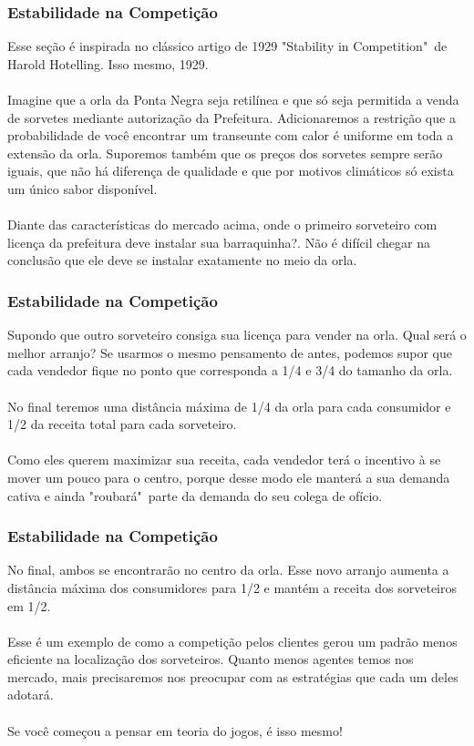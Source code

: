 \documentclass{beamer}[10]
\begin{document}

\begin{frame}
	\frametitle{Estabilidade na Competição}

	Esse seção é inspirada no clássico artigo de 1929 "Stability in Competition"\ de Harold Hotelling. Isso mesmo, 1929.
	\\~\\
	Imagine que a orla da Ponta Negra seja retilínea e que só seja permitida a venda de sorvetes mediante autorização da Prefeitura. Adicionaremos a restrição que a probabilidade de você encontrar um transeunte com calor é uniforme em toda a extensão da orla. Suporemos também que os preços dos sorvetes sempre serão iguais, que não há diferença de qualidade e que por motivos climáticos só exista um único sabor disponível.
	\\~\\
	Diante das características do mercado acima, onde o primeiro sorveteiro com licença da prefeitura deve instalar sua barraquinha?. Não é difícil chegar na conclusão que ele deve se instalar exatamente no meio da orla.

\end{frame}

\begin{frame}
	\frametitle{Estabilidade na Competição}

	Supondo que outro sorveteiro consiga sua licença para vender na orla. Qual será o melhor arranjo? Se usarmos o mesmo pensamento de antes, podemos supor que cada vendedor fique no ponto que corresponda a 1/4 e 3/4 do tamanho da orla.
	\\~\\
	No final teremos uma distância máxima de 1/4 da orla para cada consumidor e 1/2 da receita total para cada sorveteiro.
	\\~\\
	Como eles querem maximizar sua receita, cada vendedor terá o incentivo à se mover um pouco para o centro, porque desse modo ele manterá a sua demanda cativa e ainda "roubará"\ parte da demanda do seu colega de ofício.

\end{frame}

\begin{frame}
	\frametitle{Estabilidade na Competição}

	No final, ambos se encontrarão no centro da orla. Esse novo arranjo aumenta a distância máxima dos consumidores para 1/2 e mantém a receita dos sorveteiros em 1/2.
	\\~\\
	Esse é um exemplo de como a competição pelos clientes gerou um padrão menos eficiente na localização dos sorveteiros. Quanto menos agentes temos nos mercado, mais precisaremos nos preocupar com as estratégias que cada um deles adotará.
	\\~\\
	Se você começou a pensar em teoria do jogos, é isso mesmo!
\end{frame}
\end{document}
